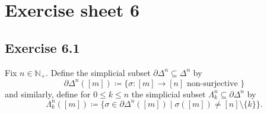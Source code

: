 \section{ Exercise sheet 6 }

\subsection{ Exercise 6.1 }

Fix $ n \in \mathbb{ N }_+ $.
Define the simplicial subset $ \partial \Delta^n \subseteq \Delta^n $ by
\[
    \partial \Delta^n ( [ m ] ) \coloneqq \{ \sigma \colon [ m ] \to [ n ] \text{ non-surjective } \}
\]
and similarly, define for $ 0 \leq k \leq n $ the simplicial subset $ \Lambda_k^n \subseteq \partial \Delta^n $ by
\[
    \Lambda_k^n( [ m ] ) \coloneqq \{ \sigma  \in \partial \Delta^n ( [ m ] ) \mid \sigma ( [ m ] ) \neq [ n ] \setminus \{ k \} \}.
\]
